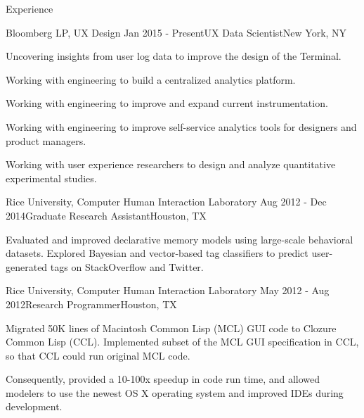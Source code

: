 
\begin{rSection}{Experience}

  \begin{rSubsection}{Bloomberg LP, UX Design}
    {Jan 2015 - Present}{UX Data Scientist}{New York, NY}
  \item Uncovering insights from user log data to improve the design of the Terminal.
  \item Working with engineering to build a centralized analytics platform.
  \item Working with engineering to improve and expand current instrumentation.
  \item Working with engineering to improve self-service analytics tools for designers and product managers.
  \item Working with user experience researchers to design and analyze quantitative experimental studies.
  \end{rSubsection}

  \begin{rSubsection}{Rice University, Computer Human Interaction Laboratory}
    {Aug 2012 - Dec 2014}{Graduate Research Assistant}{Houston, TX}
  \item Evaluated and improved declarative memory models using large-scale behavioral datasets.
    Explored Bayesian and vector-based tag classifiers to predict user-generated tags on StackOverflow and Twitter.
  \end{rSubsection}

  \begin{rSubsection}{Rice University, Computer Human Interaction Laboratory}
    {May 2012 - Aug 2012}{Research Programmer}{Houston, TX}
  \item Migrated 50K lines of Macintosh Common Lisp (MCL) GUI code to Clozure Common Lisp (CCL).
    Implemented subset of the MCL GUI specification in CCL, so that CCL could run original MCL code.
  \item Consequently, provided a 10-100x speedup in code run time, and allowed modelers to use the newest OS X operating system and improved IDEs during development.
  \end{rSubsection}


\end{rSection}
